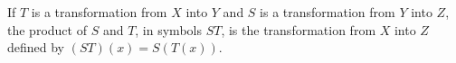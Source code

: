 If $T$ is a transformation from $X$ into $Y$ and $S$ is a transformation from $Y$ into $Z$, the product of $S$ and $T$, in symbols $ST$, is the transformation from $X$ into $Z$ defined by $(ST)(x) = S(T(x))$.
